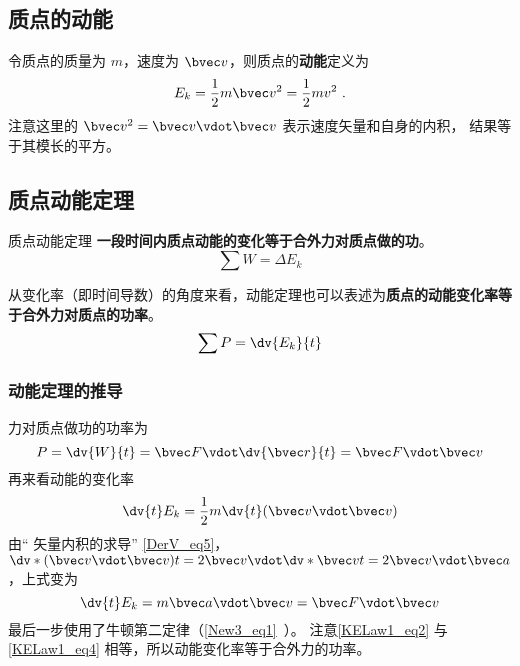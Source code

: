 
\subsection{质点的动能}
令质点的质量为 $m$，速度为 $\bvec v$，则质点的\textbf{动能}定义为
\begin{equation}
E_k = \frac12 m\bvec v^2 = \frac12 mv^2~.
\end{equation}
注意这里的 $\bvec v^2 = \bvec v \vdot \bvec v$ 表示速度矢量和自身的内积， 结果等于其模长的平方。

\subsection{质点动能定理}
\begin{theorem}{质点动能定理}
\textbf{一段时间内质点动能的变化等于合外力对质点做的功}。
\begin{equation}
\sum W=\Delta E_k
\end{equation}

从变化率（即时间导数）的角度来看，动能定理也可以表述为\textbf{质点的动能变化率等于合外力对质点的功率}。
\begin{equation}
\sum P=\dv{E_k}{t}
\end{equation}
\end{theorem}

\subsubsection{动能定理的推导}
力对质点做功的功率为
\begin{equation}\label{KELaw1_eq2}
P = \dv{W}{t} =  \bvec F\vdot \dv{\bvec r}{t} = \bvec F\vdot\bvec v
\end{equation}
再来看动能的变化率
\begin{equation}
\dv{t} E_k = \frac12 m\dv{t} (\bvec v\vdot\bvec v)
\end{equation}
由“ 矢量内积的求导” \autoref{DerV_eq5}，$\dv*{(\bvec v\vdot\bvec v)}{t} = 2\bvec v\vdot \dv*{\bvec v}{t} = 2\bvec v\vdot\bvec a$，上式变为
\begin{equation}\label{KELaw1_eq4}
\dv{t} E_k = m\bvec a\vdot\bvec v = \bvec F\vdot\bvec v
\end{equation}
最后一步使用了牛顿第二定律（\autoref{New3_eq1}~）。 注意\autoref{KELaw1_eq2} 与\autoref{KELaw1_eq4} 相等，所以动能变化率等于合外力的功率。